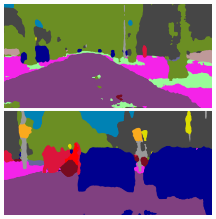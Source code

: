\documentclass[10pt, a4paper]{article}
\begin{document}
\begin{figure}[h]
\begin{minipage}[b]{0.8\linewidth}
{\begin{minipage}[b]{0.31\linewidth}
        \includegraphics[width=\linewidth]{imgs/r50-leverkusen_000013_000019_leftImg8bit.png}\vspace{0pt}
        \includegraphics[width=\linewidth]{imgs/r50-munich_000079_000019_leftImg8bit.png}
      \end{minipage}
    }
\end{minipage}
\end{figure}
\end{document}
